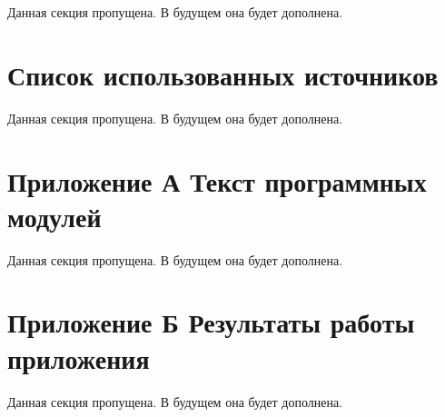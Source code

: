 \documentclass[12pt,a4paper,draft]{report}
\begin{document}
Данная секция пропущена.
В будущем она будет дополнена.

\chapter*{Список использованных источников}

Данная секция пропущена.
В будущем она будет дополнена.

\chapter*{Приложение А Текст программных модулей}

Данная секция пропущена.
В будущем она будет дополнена.

\chapter*{Приложение Б Результаты работы приложения}

Данная секция пропущена.
В будущем она будет дополнена.
\end{document}
